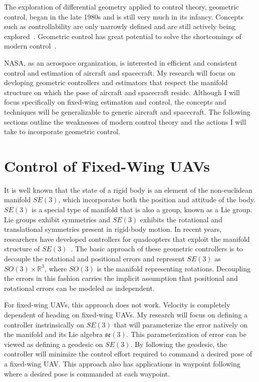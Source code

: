\documentclass[letterpaper, 10 pt, conference]{ieeeconf}  %
\begin{document}
The exploration of differential geometry applied to control theory, geometric control, began in the late 1980s and is still very much in its infancy. Concepts such as controllability are only narrowly defined and are still actively being explored~\cite{Bullo2004Geometric}. Geometric control has great potential to solve the shortcomings of modern control~\cite{Lewis2018Bountiful}.

NASA, as an aerospace organization, is interested in efficient and consistent control and estimation of aircraft and spacecraft. My research will focus on devloping geometric controllers and estimators that respect the manifold structure on which the pose of aircraft and spacecraft reside. Although I will focus specifically on fixed-wing estimation and control, the concepts and techniques will be generalizable to generic aircraft and spacecraft. The following sections outline the weaknesses of modern control theory and the actions I will take to incorporate geometric control.

\section{Control of Fixed-Wing UAVs}
It is well known that the state of a rigid body is an element of the non-euclidean manifold $SE(3)$, which incorporates both the position and attitude of the body. $SE(3)$ is a special type of manifold that is also a group, known as a Lie group. Lie groups exhibit symmetries and $SE(3)$ exhibits the rotational and translational symmetries present in rigid-body motion. In recent years, researchers have developed controllers for quadcopters that exploit the manifold structure of $SE(3)$~\cite{Lee2010Control, Lee2010Geometric}. The basic approach of these geometric controllers is to decouple the rotational and positional errors and represent $SE(3)$ as $SO(3) \times \mathds{R}^3$, where $SO(3)$ is the manifold representing rotations. Decoupling the errors in this fashion carries the implicit assumption that positional and rotational errors can be modeled as independent.

For fixed-wing UAVs, this approach does not work. Velocity is completely dependent of heading on fixed-wing UAVs. My research will focus on defining a controller instrinsically on $SE(3)$ that will parameterize the error natively on the manifold and its Lie algebra $\mathfrak{se}(3)$. This parameterization of error can be viewed as defining a geodesic on $SE(3)$. By following the geodesic, the controller will minimize the control effort required to command a desired pose of a fixed-wing UAV. This approach also has applications in waypoint following where a desired pose is commanded at each waypoint.
\end{document}
